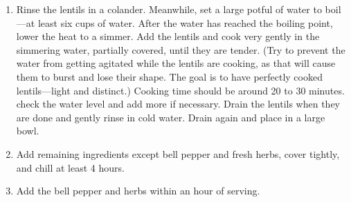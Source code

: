 
\begin{ingredients}
\end{ingredients}


\begin{recipe}
  \begin{enumerate}
  \item Rinse the lentils in a colander.  Meanwhile, set a large
    potful of water to boil---at least six cups of water.  After the
    water has reached the boiling point, lower the heat to a simmer.
    Add the lentils and cook very gently in the simmering water,
    partially covered, until they are tender. (Try to prevent the
    water from getting agitated while the lentils are cooking, as that
    will cause them to burst and lose their shape. The goal is to have
    perfectly cooked lentils---light and distinct.) Cooking time
    should be around 20 to 30 minutes. check the water level and add
    more if necessary. Drain the lentils when they are done and gently
    rinse in cold water. Drain again and place in a large bowl.

\item Add remaining ingredients except bell pepper and fresh herbs,
  cover tightly, and chill at least 4 hours.

\item Add the bell pepper and herbs within an hour of serving.
  \end{enumerate}
\end{recipe}
